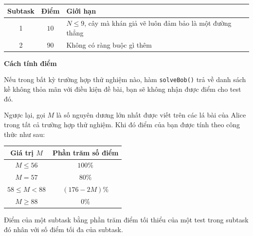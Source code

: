 \begin{center}
  \begin{tabular}{|c|c|l|} \hline
    \textbf{Subtask} & \textbf{Điểm} & \textbf{Giới hạn} \\ \hline
    1 & $10$ & $N\le 9$, cây mà khán giả vẽ luôn đảm bảo là một đường thẳng \\ \hline
    2 & $90$ & Không có ràng buộc gì thêm \\ \hline
  \end{tabular}
\end{center}

\textbf{Cách tính điểm}

Nếu trong bất kỳ trường hợp thử nghiệm nào, hàm \texttt{solveBob()} trả về danh sách kề không thỏa mãn với điều kiện đề bài, bạn sẽ không nhận được điểm cho test đó.

Ngược lại, gọi $M$ là số nguyên dương lớn nhất được viết trên các lá bài của Alice trong tất cả trường hợp thử nghiệm. Khi đó điểm của bạn được tính theo công thức như sau:

\begin{center}
  \begin{tabular}{|c|c|} \hline
    \textbf{Giá trị $M$} & \textbf{Phần trăm số điểm} \\ \hline
    $M\le 56$ & $100\%$ \\ \hline
    $M=57$ & $80\%$ \\ \hline
    $58\le M\lt 88$ & $(176-2M)\%$ \\ \hline
    $M\ge 88$ & $0\%$ \\ \hline
  \end{tabular}
\end{center}

Điểm của một subtask bằng phần trăm điểm tối thiểu của một test trong subtask đó nhân với số điểm tối đa của subtask.